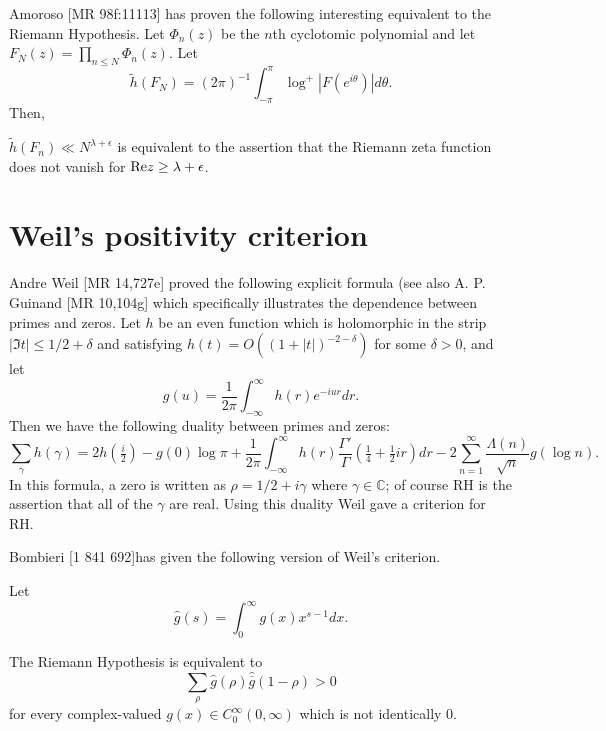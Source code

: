 \documentclass[12pt,letterpaper, reqno]{amsart}
\begin{document}
\begin{problemblock}
Amoroso [MR 98f:11113] has proven the following interesting equivalent
to the Riemann Hypothesis.  Let $\Phi_n(z)$ be the $n$th cyclotomic
polynomial and let $F_N(z) = \prod_{n \le N}\Phi_n(z)$. Let
$$\tilde h(F_N) = (2\pi)^{-1}\int_{-\pi}^\pi \log^+|F(e^{i\theta})| d\theta.$$
Then,
\begin{rhequivalence}[4.2]
$\tilde h(F_n) \ll N^{\lambda + \epsilon}$ is equivalent to the assertion that the Riemann zeta function does not vanish for ${\rm Re}{z} \ge \lambda + \epsilon$.
\end{rhequivalence}
\end{problemblock}


\section{Weil's positivity criterion}
Andre Weil [MR 14,727e] proved the following explicit formula (see also A. P. Guinand [MR 10,104g] which
specifically illustrates the dependence between primes and zeros.
 Let $h$ be an
even function which is holomorphic in the strip $|\Im t|\le
1/2+\delta$ and satisfying $h(t)=O((1+|t|)^{-2-\delta})$ for some
$\delta>0$, and let
$$g(u)=\frac{1}{2\pi}\int_{-\infty}^\infty h(r)e^{-i u r} dr.$$
Then we have the following duality between primes and zeros:
$$
\sum_{\gamma}h(\gamma)=2h(\tfrac{i}2)  -g(0) \log \pi
+\frac{1}{2\pi} \int_{-\infty}^\infty
h(r)\frac{\Gamma'}{\Gamma}(\tfrac14+\tfrac 12 i
r) dr-2\sum_{n=1}^\infty \frac{\Lambda(n)}{\sqrt{n}}g(\log n).$$
 In this formula, a zero is written as $\rho=1/2+i\gamma$ where
$\gamma\in \mathbb C$; of course RH is the assertion that all of
the $\gamma$ are real. Using this duality Weil gave a criterion for RH.

\begin{problemblock}
Bombieri [1 841 692]has given the following version of Weil's criterion.

Let
$$
\hat{g}(s)=\int_0^\infty g(x)x^{s-1} dx.
$$
\begin{rhequivalence}[5.1]The Riemann Hypothesis is
equivalent to
$$\sum_{\rho}\hat{g}(\rho) \hat{\overline{g}}(1-\rho)>0$$
for every complex-valued $g(x)\in C_0^\infty(0,\infty)$
which is not identically 0.
\end{rhequivalence}
\end{problemblock}
\end{document}
